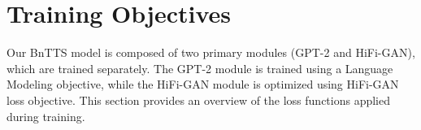 







\section{Training Objectives}
\label{app:training_objective}

Our BnTTS model is composed of two primary modules (GPT-2 and HiFi-GAN), which are trained separately. The GPT-2 module is trained using a Language Modeling objective, while the HiFi-GAN module is optimized using HiFi-GAN loss objective. This section provides an overview of the loss functions applied during training.

